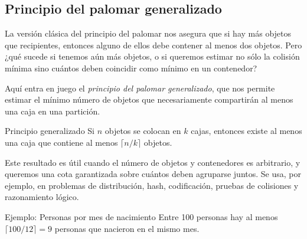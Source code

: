 \subsection*{Principio del palomar generalizado}
La versión clásica del principio del palomar nos asegura que si hay más objetos que recipientes, entonces alguno de ellos debe contener al menos dos objetos. Pero ¿qué sucede si tenemos aún más objetos, o si queremos estimar no sólo la colisión mínima sino cuántos deben coincidir como mínimo en un contenedor?

Aquí entra en juego el \emph{principio del palomar generalizado}, que nos permite estimar el mínimo número de objetos que necesariamente compartirán al menos una caja en una partición.

\begin{definitionblock}{Principio generalizado}
Si $n$ objetos se colocan en $k$ cajas, entonces existe al menos una caja que contiene al menos $\lceil n/k \rceil$ objetos.
\end{definitionblock}

Este resultado es útil cuando el número de objetos y contenedores es arbitrario, y queremos una cota garantizada sobre cuántos deben agruparse juntos. Se usa, por ejemplo, en problemas de distribución, hash, codificación, pruebas de colisiones y razonamiento lógico.


\begin{exampleblock}{Ejemplo: Personas por mes de nacimiento}
Entre 100 personas hay al menos $\lceil 100 / 12 \rceil = 9$ personas que nacieron en el mismo mes.
\end{exampleblock}



